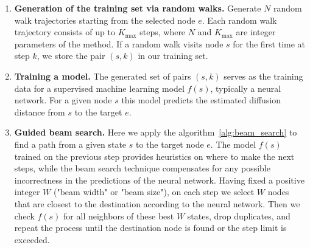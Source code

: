 \documentclass[reqno,11pt]{amsart}
\begin{document}
\begin{enumerate}
    \item {\bf Generation of the training set via random walks.} 
    Generate $N$ random walk trajectories starting from the selected node $e$. Each random walk trajectory consists of up to $K_{\text{max}}$ steps, where $N$ and $K_{\text{max}}$ are integer parameters of the method. If a random walk visits node $s$ for the first time at step $k$, we store the pair $(s,k)$ in our training set. 
    
    \item {\bf Training a model.}  
    The generated set of pairs $(s,k)$ serves as the training data for a supervised machine learning model $f(s)$, typically a neural network.
    For a given node $s$ this model predicts the estimated diffusion distance from $s$ to the target $e$.

    \item {\bf Guided beam search.} Here we apply the algorithm~\ref{alg:beam_search} to find a path from a given state $s$ to the target node $e$. The model $f(s)$ trained on the previous step provides heuristics on where to make the next steps, while the beam search technique compensates for any possible incorrectness in the predictions of the neural network. Having fixed a positive integer $W$ ("beam width" or "beam size"), on each step we select $W$ nodes that are closest to the destination according to the neural network. Then we check $f(s)$ for all neighbors of these best $W$ states, drop duplicates, and repeat the process until the destination node is found or the step limit is exceeded.
  
\end{enumerate}
\end{document}
